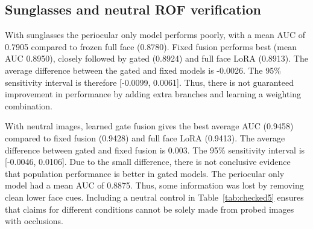 \documentclass[10pt,lettersize,journal]{IEEEtran}
\begin{document}
\subsection{Sunglasses and neutral ROF verification}
With sunglasses the periocular only model performs poorly, with a mean AUC of 0.7905 compared to frozen full face (0.8780). Fixed fusion performs best (mean AUC 0.8950), closely followed by gated (0.8924) and full face LoRA (0.8913). The average difference between the gated and fixed models is -0.0026. The 95\% sensitivity interval is therefore [-0.0099, 0.0061]. Thus, there is not guaranteed improvement in performance by adding extra branches and learning a weighting combination.\par
With neutral images, learned gate fusion gives the best average AUC (0.9458) compared to fixed fusion (0.9428) and full face LoRA (0.9413). The average difference between gated and fixed fusion is 0.003. The 95\% sensitivity interval is [-0.0046, 0.0106]. Due to the small difference, there is not conclusive evidence that population performance is better in gated models. The periocular only model had a mean AUC of 0.8875. Thus, some information was lost by removing clean lower face cues. Including a neutral control in Table~\ref{tab:checked5} ensures that claims for different conditions cannot be solely made from probed images with occlusions.\par
\end{document}
